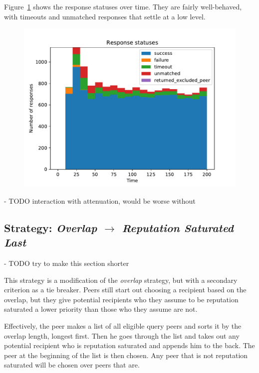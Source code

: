 Figure~\ref{fig:selection_overlap_resp_statuses} shows the response statuses
over time. They are fairly well-behaved, with timeouts and unmatched responses
that settle at a low level.

\begin{figure}[t]
\centering
\includegraphics[width=1\columnwidth]{figures/selection_overlap_resp_statuses}
\label{fig:selection_overlap_resp_statuses}
\end{figure}

- TODO interaction with attenuation, would be worse without

\subsection{Strategy: \emph{Overlap $\rightarrow$ Reputation Saturated Last}}
- TODO try to make this section shorter

This strategy is a modification of the \emph{overlap} strategy, but with a
secondary criterion as a tie breaker. Peers still start out choosing a recipient
based on the overlap, but they give potential recipients who they assume to be
reputation saturated a lower priority than those who they assume are not.

Effectively, the peer makes a list of all eligible query peers and sorts it by
the overlap length, longest first. Then he goes through the list and takes out
any potential recipient who is reputation saturated and appends him to the back.
The peer at the beginning of the list is then chosen. Any peer that is not
reputation saturated will be chosen over peers that are.

